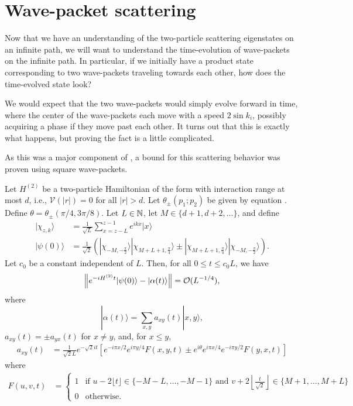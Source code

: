 \documentclass[../thesis-main/thesis-main]{subfiles}
\begin{document}

\section{Wave-packet scattering}

Now that we have an understanding of the two-particle scattering eigenstates on an infinite path, we will want to understand the time-evolution of wave-packets on the infinite path.  In particular, if we initially have a product state corresponding to two wave-packets traveling towards each other, how does the time-evolved state look?

We would expect that the two wave-packets would simply evolve forward in time, where the center of the wave-packets each move with a speed $2\sin k_i$, possibly acquiring a phase if they move past each other.  It turns out that this is exactly what happens, but proving the fact is a little complicated. 

As this was a major component of \cite{MPQW}, a bound for this scattering behavior was proven using square wave-packets.
\begin{theorem}Let $H^{(2)}$ be a two-particle Hamiltonian of the form  with interaction range at most $d$, i.e., $\mathcal{V}(|r|)=0$ for all $|r|>d$. Let $\theta_{\pm}(p_1;p_2)$ be given by equation . Define $\theta=\theta_{\pm}({\pi}/{4},{3\pi}/{8})$. Let $L\in\mathbb{N}$, let $M\in\{d+1,d+2,\ldots\}$, and define
\begin{align}
|\chi_{z,k}\rangle & =  \frac{1}{\sqrt{L}}\sum_{x=z-L}^{z-1}e^{ikx}|x\rangle\\
|\psi(0)\rangle & =  \frac{1}{\sqrt{2}}\left(|\chi_{-M,-\frac{\pi}{2}}\rangle|\chi_{M+L+1,\frac{\pi}{4}}\rangle 
	\pm |\chi_{M+L+1,\frac{\pi}{4}}\rangle|\chi_{-M,-\frac{\pi}{2}}\rangle\right).
\end{align}
Let $c_{0}$ be a constant independent of $L$. Then, for all $0\leq t\leq c_{0}L$, we have
\[
\left\Vert e^{-iH^{(2)}t}|\psi(0)\rangle-|\alpha(t)\rangle\right\Vert =\mathcal{O}(L^{-{1}/{4}}),
\]
where 
\begin{equation}
|\alpha(t)\rangle=\sum_{x,y}a_{xy}(t)|x,y\rangle,
\end{equation}
$a_{xy}(t)=\pm a_{yx}(t)$ for $x \ne y$, and, for $x\leq y$, 
\begin{align}
a_{xy}(t) & =  \frac{1}{\sqrt{2}L}e^{-\sqrt{2}it}\left[e^{-i \pi x/2} e^{i \pi y/4} F(x,y,t) 
    \pm e^{i\theta} e^{i \pi x/4} e^{-i \pi y/2} F(y,x,t) \right]
\label{eq:a_xy}
\end{align}
where
\begin{align}
F(u,v,t) & =  \begin{cases}
	1 & \text{if }u-2 \lfloor t \rfloor\in\{-M-L,\ldots,-M-1\}\text{ and }v+2\left\lfloor \frac{t}{\sqrt{2}}
	\right\rfloor \in\{M+1,\ldots,M+L\}\\
	0 & \text{otherwise.}\end{cases}
\end{align}
\end{theorem}
\end{document}
